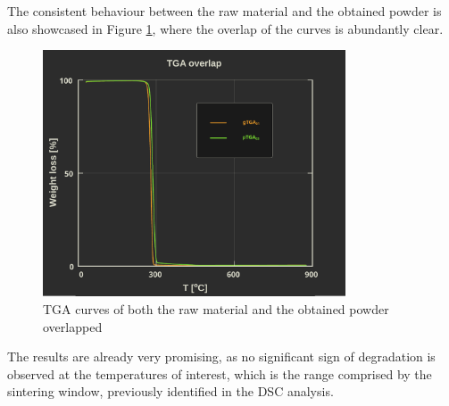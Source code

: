 \documentclass[a4paper]{article}
\begin{document}
            \clearpage

            The consistent behaviour between the raw material and the obtained powder is also showcased in Figure \ref{fig:TGA_overlapped_powderpellet}, where the overlap 
            of the curves is abundantly clear. \\

            \begin{figure}[H]
                \centering
                \includegraphics[width=0.8\textwidth]{Pictures/Thermal_analysis_plots/TGA_catalogued/Fixed/TGA_overlapped_powderpellet.pdf}
                \caption{TGA curves of both the raw material and the obtained powder overlapped}
                \label{fig:TGA_overlapped_powderpellet}
            \end{figure}



            The results are already very promising, as no significant sign of degradation is observed at the temperatures of interest, 
            which is the range comprised by the sintering window, previously identified in the DSC analysis. \\

        \clearpage

        
\end{document}
